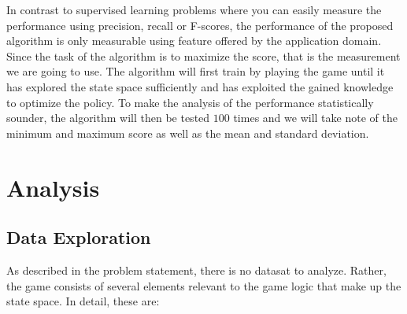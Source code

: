 \documentclass[a4paper,10pt]{article}
\begin{document}
In contrast to supervised learning problems where you can easily measure the performance using precision, recall or F-scores, the performance of the proposed algorithm is only measurable using feature offered by the application domain.
Since the task of the algorithm is to maximize the score, that is the measurement we are going to use.
The algorithm will first train by playing the game until it has explored the state space sufficiently and has exploited the gained knowledge to optimize the policy.
To make the analysis of the performance statistically sounder, the algorithm will then be tested $100$ times and we will take note of the minimum and maximum score as well as the mean and standard deviation.
\section{Analysis}

\subsection{Data Exploration}
\label{dataexploration}

As described in the problem statement, there is no datasat to analyze.
Rather, the game consists of several elements relevant to the game logic that make up the state space.
In detail, these are:
\end{document}
